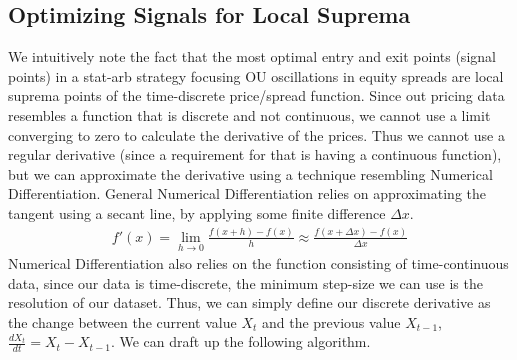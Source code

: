 \documentclass{article}
\begin{document}
\begin{spacing}{2.0}
\subsection{Optimizing Signals for Local Suprema}

We intuitively note the fact that the most optimal entry and exit points (signal points) in a stat-arb strategy focusing OU oscillations in equity spreads are local suprema points of
the time-discrete price/spread function. Since out pricing data resembles a function that is discrete and not continuous, we cannot use a limit converging to zero to calculate the derivative
of the prices. Thus we cannot use a regular derivative (since a requirement for that is having a continuous function), but we can
approximate the derivative using a technique resembling Numerical Differentiation. General Numerical Differentiation relies on approximating the tangent using a secant line, by applying some
finite difference $\Delta x$.
\begin{gather*}
    f'(x) = \underset{h \to 0}{\lim} \frac{f(x + h) - f(x)}{h} \approx
    \frac{f(x + \Delta x) - f(x)}{\Delta x}
\end{gather*}
Numerical Differentiation also relies on the function consisting of time-continuous data, since our data is time-discrete, the minimum step-size we can use is the resolution of our
dataset. Thus, we can simply define our discrete derivative as the change between the current value $X_{t}$ and the previous value $X_{t - 1}$, $\frac{dX_{t}}{dt} = X_{t} - X_{t - 1}$.
We can draft up the following algorithm.


\end{spacing}
\end{document}
